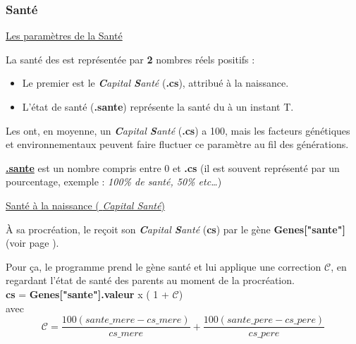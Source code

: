 \documentclass[french]{report}
\begin{document}
\subsubsection{Santé}\label{sante}
\begin{center}
	
\underline{Les paramètres de la Santé}

\end{center}
La santé des \CoCiX est représentée par \textbf{2} nombres réels positifs :\\
\begin{itemize}
\item Le premier est le \textit{\textbf{C}apital \textbf{S}anté} (\textbf{.cs}), attribué à la naissance.
\item L'état de santé (\textbf{.sante}) représente la santé du \CoCiX à un instant T.
\end{itemize}

Les \CoCiX ont, en moyenne, un \textit{\textbf{C}apital \textbf{S}anté} (\textbf{.cs})  a 100, mais les facteurs génétiques et environnementaux peuvent faire fluctuer ce paramètre au fil des générations.

\textbf{\underline{.sante}} est un nombre compris entre 0 et \textbf{.cs} (il est souvent représenté par un pourcentage, exemple : \textit{100\% de santé, 50\% etc\dots})
\begin{center}
	
\underline{Santé à la naissance ( \textit{Capital Santé})}\label{sante_naissance}

\end{center}
À sa procréation, le \CoCiX reçoit son \textit{\textbf{C}apital \textbf{S}anté} (\textbf{cs}) par le gène \textbf{Genes["sante"]} (voir page \pageref{liste_gene}).

Pour ça, le programme prend le gène santé et lui applique une correction \textbf{$\mathcal{C}$}, en regardant l'état de santé des parents au moment de la procréation.\\


\textbf{cs} = \textbf{Genes["sante"].valeur} x ( 1  + $\mathcal{C}$) \\

avec \[ \mathcal{C} = \frac{100(sante\_mere - cs\_mere)}{cs\_mere} + \frac{100(sante\_pere - cs\_pere)}{cs\_pere}\]
\end{document}
